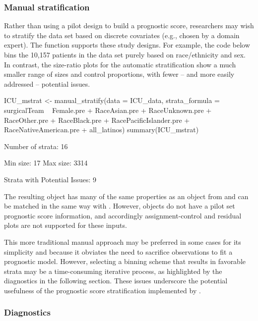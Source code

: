 \subsubsection{Manual stratification}\label{subsubsec:real_mstrat}

Rather than using a pilot design to build a prognostic score,  researchers may wish to stratify the data set based on discrete covariates (e.g., chosen by a domain expert). The   function supports these study designs. For example, the code below bins the 10,157 patients in the data set purely based on race/ethnicity and sex. In contrast, the size-ratio plots for the automatic stratification show a much smaller range of sizes and control proportions, with fewer -- and more easily addressed -- potential issues.

\begin{example}
ICU_mstrat <- manual_stratify(data = ICU_data,
    strata_formula = surgicalTeam ~ Female.pre + RaceAsian.pre +
      RaceUnknown.pre + RaceOther.pre + RaceBlack.pre + 
      RacePacificIslander.pre + RaceNativeAmerican.pre + all_latinos) 
summary(ICU_mstrat)
\end{example}
\begin{example}
Number of strata: 16 

	Min size: 17 	Max size: 3314

Strata with Potential Issues: 9 
\end{example}

The resulting  object has many of the same properties as an  object from  and can be matched in the same way with . However,  objects do not have a pilot set prognostic score information, and accordingly assignment-control and residual plots are not supported for these inputs.  

This more traditional manual approach may be preferred in some cases for its simplicity and because it obviates the need to sacrifice observations to fit a prognostic model. However, selecting a binning scheme that results in favorable strata may be a time-consuming iterative process, as highlighted by the diagnostics in the following section. These issues underscore the potential usefulness of the prognostic score stratification implemented by .

\subsubsection{Diagnostics}\label{subsubsec:real_diagnostics}

